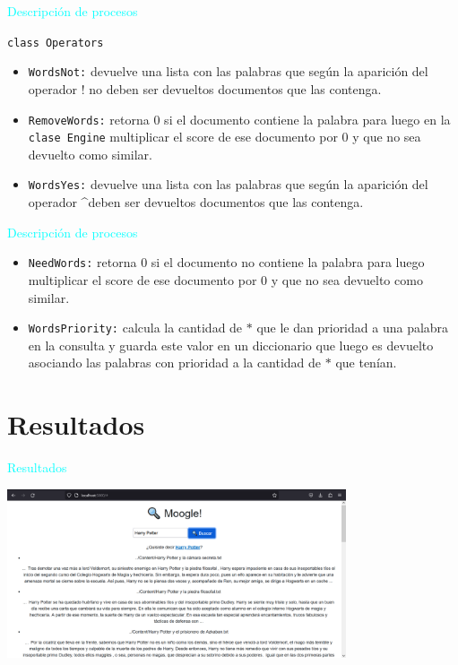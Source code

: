 \documentclass[a4paper, 12pt]{beamer}
\begin{document}
\begin{frame}{\textcolor{cyan}{Descripción de procesos}}

    {\tt class Operators}
    \begin{itemize}
    \item {\small {\tt WordsNot:} devuelve una lista con las palabras que según la aparición del
    operador $!$ no deben ser devueltos documentos que las contenga.}
    \item {\small {\tt RemoveWords:} retorna 0 si el documento contiene la palabra para luego
    en la {\tt clase Engine} multiplicar el score de ese documento por 0 y que no sea
    devuelto como similar.}
    \item {\small {\tt WordsYes:} devuelve una lista con las palabras que según la aparición del
    operador \textasciicircum deben ser devueltos documentos que las contenga.}
    \end{itemize}
\end{frame}

\begin{frame}{\textcolor{cyan}{Descripción de procesos}}

    \begin{itemize}
    \item {\small {\tt NeedWords:} retorna 0 si el documento no contiene la palabra para luego
    multiplicar el score de ese documento por 0 y que no sea devuelto como
    similar.}
    \item {\small {\tt WordsPriority:} calcula la cantidad de $*$ que le dan prioridad a una
    palabra en la consulta y guarda este valor en un diccionario que luego es
    devuelto asociando las palabras con prioridad a la cantidad de $*$ que tenían.}
    \end{itemize}
\end{frame}

\section{Resultados}

\begin{frame}{\textcolor{cyan}{Resultados}}
    \begin{center}
        \includegraphics[width=10cm]{images/image 1.png}
      \end{center}
    
\end{frame}
\end{document}
